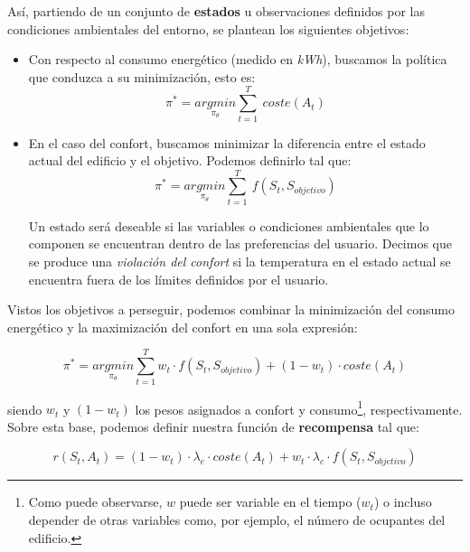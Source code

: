 Así, partiendo de un conjunto de \textbf{estados} u observaciones definidos por las condiciones ambientales del entorno, se plantean los siguientes objetivos:

\begin{itemize}
    
    \item Con respecto al consumo energético (medido en \textit{kWh}), buscamos la política que conduzca a su minimización, esto es:
        \begin{equation}
            \pi^* = \underset{\pi_\theta}{argmin}\sum^T_{t=1}\ coste(A_t)
        \end{equation}

    \item En el caso del confort, buscamos minimizar la diferencia entre el estado actual del edificio y el objetivo. Podemos definirlo tal que:
        \begin{equation}
            \pi^* = \underset{\pi_\theta}{argmin}\sum^T_{t=1}\ f(S_t, S_{objetivo})
        \end{equation}
    
    Un estado será deseable si las variables o condiciones ambientales que lo componen se encuentran dentro de las preferencias del usuario. Decimos que se produce una \textit{violación del confort} si la temperatura en el estado actual se encuentra fuera de los límites definidos por el usuario.
    
\end{itemize}

Vistos los objetivos a perseguir, podemos combinar la minimización del consumo energético y la maximización del confort en una sola expresión:

\begin{equation}
    \pi^* = \underset{\pi_\theta}{argmin}\sum^T_{t=1} w_t \cdot f(S_t,S_{objetivo}) + (1 - w_t) \cdot coste(A_t)
\end{equation}

siendo $w_t$ y $(1 - w_t)$ los pesos asignados a confort y consumo\footnote{Como puede observarse, $w$ puede ser variable en el tiempo ($w_t$) o incluso depender de otras variables como, por ejemplo, el número de ocupantes del edificio.}, respectivamente. Sobre esta base, podemos definir nuestra función de \textbf{recompensa} tal que:

\begin{equation}
    \label{eq:reward}
    r(S_t,A_t) = (1-w_t) \cdot \lambda_e \cdot coste(A_t) + w_t \cdot \lambda_c \cdot f(S_t,S_{objetivo})
\end{equation}

